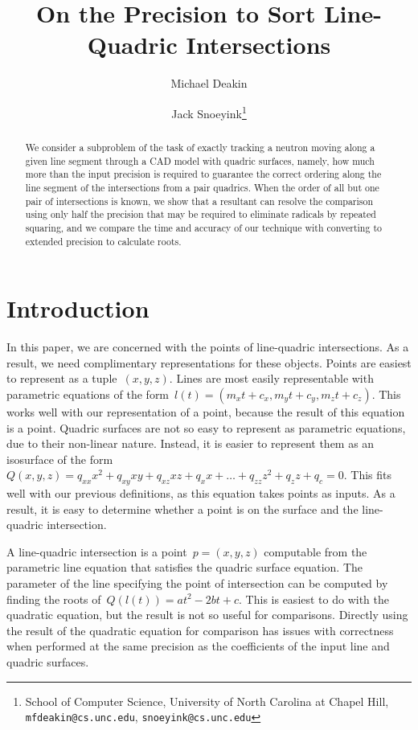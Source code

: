 \documentclass{cccg16}
\title{On the Precision to Sort Line-Quadric Intersections}
\author{Michael Deakin \and Jack Snoeyink\thanks{School of Computer
    Science, University of North Carolina at Chapel Hill, {\tt
      mfdeakin@cs.unc.edu}, {\tt snoeyink@cs.unc.edu}}}
\begin{document}
\thispagestyle{empty}
\maketitle

\begin{abstract}
  We consider a subproblem of the task of exactly tracking a neutron
  moving along a given line segment through a CAD model with quadric
  surfaces, namely, how much more than the input precision is required
  to guarantee the correct ordering along the line segment of the
  intersections from a pair quadrics.  When the order of all but one
  pair of intersections is known, we show that a resultant can
  resolve the comparison using only half the precision that may be
  required to eliminate radicals by repeated squaring, and we compare
  the time and accuracy of our technique with converting to extended
  precision to calculate roots.
\end{abstract}

\section{Introduction}
In this paper, we are concerned with the points of line-quadric
intersections.  As a result, we need complimentary representations for
these objects.  Points are easiest to represent as a tuple~$(x, y,
z)$.  Lines are most easily representable with parametric equations of
the form~$l(t)=(m_x t + c_x, m_y t + c_y, m_z t + c_z)$.  This works
well with our representation of a point, because the result of this
equation is a point.  Quadric surfaces are not so easy to represent as
parametric equations, due to their non-linear nature.  Instead, it is
easier to represent them as an isosurface of the form~$Q(x, y,
z)=q_{xx} x^2 + q_{xy} xy + q_{xz} xz + q_x x + \dots + q_{zz} z^2 +
q_{z} z + q_c = 0$.  This fits well with our previous definitions, as
this equation takes points as inputs.  As a result, it is easy to
determine whether a point is on the surface and the line-quadric
intersection.

A line-quadric intersection is a point~$p=(x, y, z)$ computable from
the parametric line equation that satisfies the quadric surface
equation.  The parameter of the line specifying the point of
intersection can be computed by finding the roots of~$Q(l(t))=a t^2 -
2 b t + c$.  This is easiest to do with the quadratic equation, but
the result is not so useful for comparisons.  Directly using the
result of the quadratic equation for comparison has issues with
correctness when performed at the same precision as the coefficients
of the input line and quadric surfaces.
\end{document}
